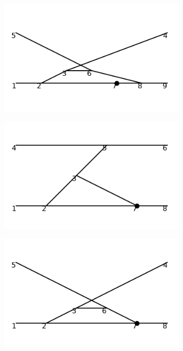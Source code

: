 \documentclass[11pt,a4paper,twoside,pdf]{article}
\numberwithin{equation}{section}
\begin{document}
\begin{figure}[h!]
\begin{subfigure}[t]{0.16\textwidth}
    \end{subfigure}
    \hfill
    \begin{subfigure}[t]{0.16\textwidth}
        \centering
        \includegraphics[width=\textwidth]{plots/order6_2to2/counterterms/10.png}
    \end{subfigure}
    \hfill
    \begin{subfigure}[t]{0.16\textwidth}
        \centering
        \includegraphics[width=\textwidth]{plots/order6_2to2/counterterms/11.png}
    \end{subfigure}
    \hfill
    \begin{subfigure}[t]{0.16\textwidth}
        \centering
        \includegraphics[width=\textwidth]{plots/order6_2to2/counterterms/12.png}

\end{subfigure}
\end{figure}
\end{document}
